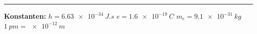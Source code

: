\documentclass[11pt,a4paper,landscape]{article}
\begin{document}
\vspace{0.8em}


\begin{center}
\rule{0.9\textwidth}{0.5pt}
\vspace{0.3em}

\textbf{Konstanten:}\quad
$h = \SI{6,63e-34}{J.s}$
\hspace{1.5cm}
$e = \SI{1,6e-19}{C}$
\hspace{1.5cm}
$m_e = \SI{9,1e-31}{kg}$
\hspace{1.5cm}
$\SI{1}{pm} = \SI{e-12}{m}$
\end{center}
\end{document}
